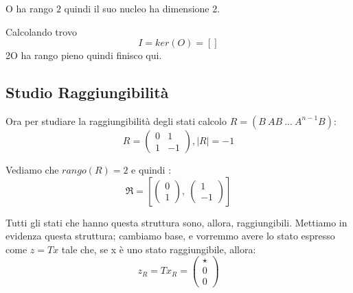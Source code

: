 \documentclass{article}
\begin{document}
O ha rango $ 2 $ quindi il suo nucleo ha dimensione $ 2 $.

Calcolando trovo \[ 
I = ker(O) = \left[ \right]\]
2O ha rango pieno quindi finisco qui.

\subsection{Studio Raggiungibilità}
Ora per studiare la raggiungibilità degli stati calcolo $R = (B\ AB\ ...\ A^{n-1}B)$: \[ R = \left(\begin{matrix}0 & 1\\1 & -1\end{matrix}\right), |R| = -1 \] 

Vediamo che $rango(R) = 2$ e quindi : \[ \mathfrak{R} = \left[ \left(\begin{matrix}0\\1\end{matrix}\right), \  \left(\begin{matrix}1\\-1\end{matrix}\right)\right] \]

Tutti gli stati che hanno questa struttura sono, allora, raggiungibili. Mettiamo in evidenza questa struttura;
cambiamo base, e vorremmo avere lo stato espresso come $z = Tx$ tale che, se x è uno stato raggiungibile, allora: \[ z_R = T x_R = \begin{pmatrix} \star  \\ 0 \\0\end{pmatrix}\]
\end{document}
